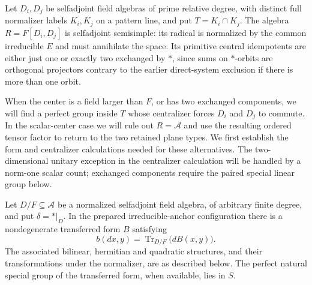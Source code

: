 \begin{convention}\label{c:field-pair-setup}
Let $D_i,D_j$ be selfadjoint field algebras of prime relative degree,
with distinct full normalizer labels $K_i,K_j$ on a pattern line, and
put $T=K_i\cap K_j$. The algebra $R=F[D_i,D_j]$ is selfadjoint
semisimple: its radical is normalized by the common irreducible $E$
and must annihilate the space. Its primitive central idempotents are
either just one or exactly two exchanged by $*$, since sums on
$*$-orbits are orthogonal projectors contrary to the earlier
direct-system exclusion if there is more than one orbit.
\end{convention}

When the center is a field larger than $F$, or has two exchanged
components, we will find a perfect group inside $T$ whose centralizer
forces $D_i$ and $D_j$ to commute. In the scalar-center case we will
rule out $R=\mathcal A$ and use the resulting ordered tensor factor
to return to the two retained plane types.
We first establish the form and centralizer calculations needed for
these alternatives. The two-dimensional unitary exception in the
centralizer calculation will be handled by a norm-one scalar count;
exchanged components require the paired special linear group below.

\begin{lemma}\label{c:field-transfer}
Let \(D/F\subseteq\mathcal A\) be a normalized selfadjoint field algebra, of arbitrary finite degree, and put \(\delta=*|_D\). In the prepared irreducible-anchor configuration there is a nondegenerate transferred form \(B\) satisfying
\[
 b(dx,y)=\operatorname{Tr}_{D/F}\bigl(dB(x,y)\bigr).
\]
The associated bilinear, hermitian and quadratic structures, and their transformations under the normalizer, are as described below. The perfect natural special group of the transferred form, when available, lies in \(S\).
\end{lemma}

